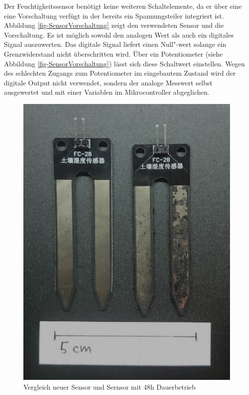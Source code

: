 Der Feuchtigkeitssensor benötigt keine weiteren Schaltelemente, da er über eine eine Vorschaltung verfügt in der bereits ein Spannungsteiler integriert ist. 
Abbildung \ref{fig-SensorVorschaltung} zeigt den verwendeten Sensor und die Vorschaltung. 
Es ist möglich sowohl den analogen Wert als auch ein digitales Signal auszuwerten.
Das digitale Signal liefert einen Null"-wert solange ein Grenzwiderstand nicht überschritten wird. 
Über ein  Potentiometer (siehe Abbildung \ref{fig-SensorVorschaltung}) lässt sich diese Schaltwert einstellen. 
Wegen des schlechten Zugangs zum Potentiometer im eingebautem Zustand wird der digitale Output nicht verwendet, sondern der analoge Messwert selbst ausgewertet und mit einer Variablen im Mikrocontroller abgeglichen.

\begin{figure}[!b]
	\centering
	\includegraphics[width=0.9\linewidth]{bilder/_fechtesensorVergleich0.jpg}
	\caption{Vergleich neuer Sensor und Sernsor mit 48h Dauerbetrieb}
	\label{fig-SensorVergleich}
\end{figure}

